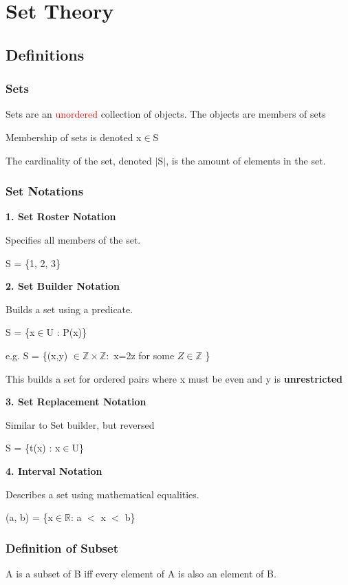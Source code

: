 \documentclass{article}
\begin{document}
\section{Set Theory}

\subsection{Definitions}
\subsubsection{Sets}
Sets are an \textcolor{red}{unordered} collection of objects. The objects are members of sets

Membership of sets is denoted x$\in$S

The cardinality of the set, denoted $\mid$S$\mid$, is the amount of elements in the set.

\subsubsection{Set Notations}
\textbf{1. Set Roster Notation}

Specifies all members of the set.

S = \{1, 2, 3\}

\vspace{10pt}

\textbf{2. Set Builder Notation}

Builds a set using a predicate.

S = \{x$\in$U : P(x)\}

e.g. S = \{(x,y) $\in \mathbb{Z} \times \mathbb{Z}:$ x=2z for some $Z \in \mathbb{Z}$ \}

This builds a set for ordered pairs where x must be even and y is \textbf{unrestricted}

\vspace{10pt}

\textbf{3. Set Replacement Notation}

Similar to Set builder, but reversed

S = \{t(x) : x$\in$U\}

\vspace{10pt}
\textbf{4. Interval Notation}

Describes a set using mathematical equalities.

(a, b) = \{x$\in \mathbb{R}$: a $<$ x $<$ b\}

\subsubsection{Definition of Subset}
A is a subset of B iff every element of A is also an element of B.
\end{document}
